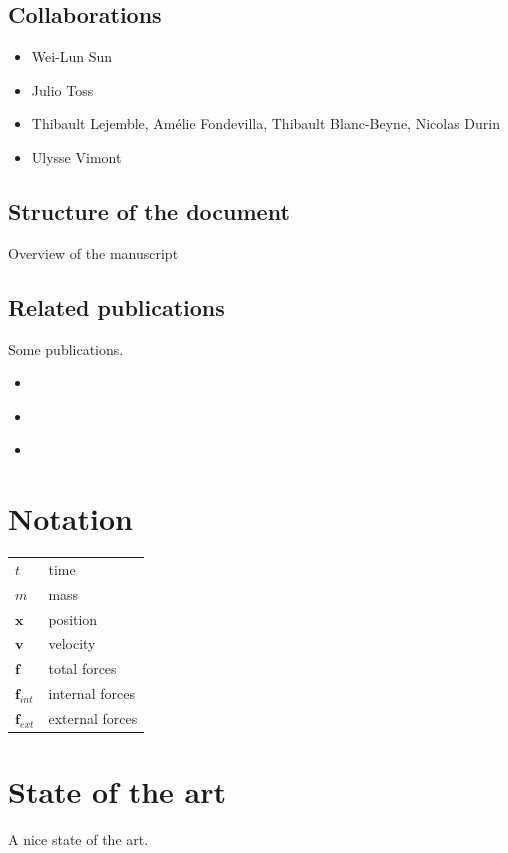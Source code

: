 \documentclass[11pt, oneside, a4paper]{memoir}
\begin{document}
\section{Collaborations}

\begin{itemize}
    \item Wei-Lun Sun
    \item Julio Toss
    \item Thibault Lejemble, Amélie Fondevilla, Thibault Blanc-Beyne, Nicolas Durin
    \item Ulysse Vimont
\end{itemize}

\section{Structure of the document}
Overview of the manuscript

\section{Related publications}
Some publications.
\begin{itemize}
    \item \cite{Manteaux2013}
    \item \cite{Lejemble2015}
    \item \cite{Manteaux2015}
\end{itemize}

\chapter{Notation}

\begin{table}[!h]
\begin{tabular}{ll}
$t$ & time \\
$m$ &  mass \\
$\mathbf{x}$ & position \\
$\mathbf{v}$ & velocity \\
$\mathbf{f}$ & total forces \\
$\mathbf{f}_{int}$ & internal forces \\
$\mathbf{f}_{ext}$ & external forces \\
\end{tabular}
\end{table}

\chapter{State of the art}
A nice state of the art.
\end{document}

